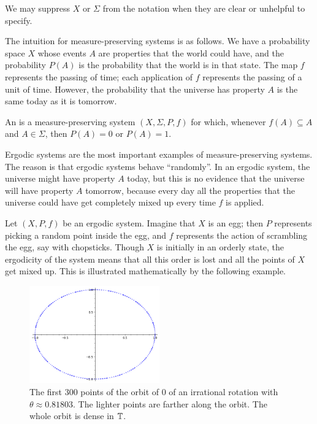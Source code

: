 \begin{subsec}
We may suppress $X$ or $\Sigma$ from the notation when they are clear or unhelpful to specify.
\end{subsec}

\begin{subsec}
The intuition for measure-preserving systems is as follows.
We have a probability space $X$ whose events $A$ are properties that the world could have, and the probability $P(A)$ is the probability that the world is in that state.
The map $f$ represents the passing of time; each application of $f$ represents the passing of a unit of time.
However, the probability that the universe has property $A$ is the same today as it is tomorrow.
\end{subsec}

\begin{definition}
An  is a measure-preserving system $(X, \Sigma, P, f)$ for which, whenever $f(A) \subseteq A$ and $A \in \Sigma$, then $P(A) = 0$ or $P(A) = 1$.
\end{definition}

\begin{subsec}
Ergodic systems are the most important examples of measure-preserving systems.
The reason is that ergodic systems behave ``randomly''.
In an ergodic system, the universe might have property $A$ today, but this is no evidence that the universe will have property $A$ tomorrow, because every day all the properties that the universe could have get completely mixed up every time $f$ is applied.

Let $(X, P, f)$ be an ergodic system.
Imagine that $X$ is an egg; then $P$ represents picking a random point inside the egg, and $f$ represents the action of scrambling the egg, say with chopsticks.
Though $X$ is initially in an orderly state, the ergodicity of the system means that all this order is lost and all the points of $X$ get mixed up.
This is illustrated mathematically by the following example.
\end{subsec}

\begin{figure}\label{irrationalRotationFig}
\caption{The first $300$ points of the orbit of $0$ of an irrational rotation with $\theta \approx 0.81803$. The lighter points are farther along the orbit. The whole orbit is dense in $\mathbb{T}$.}
\centering \includegraphics[width=0.5\textwidth]{graphics/irrationalRotationFig}
\end{figure}

